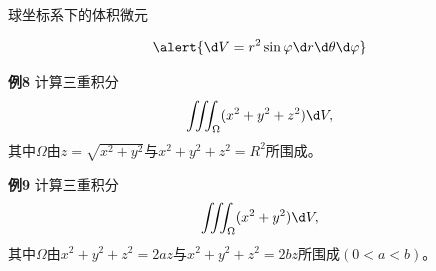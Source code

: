 \begin{frame}{球坐标系下的体积微元}
	\linespread{1.2}\pause 
			\begin{center}
				\pause 
			\end{center}
			{\Large
			\vspace{-1em}
			$$\alert{\d V=r^2\sin\varphi \d r\d\theta \d\varphi}$$
			}
\end{frame}

\begin{frame}
	\linespread{1.2}
	\begin{exampleblock}{{\bf 例8}\hfill}
		计算三重积分
		$$\iiint_{\Omega}(x^2+y^2+z^2)\d V,$$
		其中$\Omega$由$z=\sqrt{x^2+y^2}$与$x^2+y^2+z^2=R^2$所围成。
	\end{exampleblock}
\end{frame}

\begin{frame}
	\linespread{1.2}
	\begin{exampleblock}{{\bf 例9}\hfill}
		计算三重积分
		$$\iiint_{\Omega}(x^2+y^2)\d V,$$
		其中$\Omega$由$x^2+y^2+z^2=2az$与$x^2+y^2+z^2=2bz$所围成$(0<a<b)$。
	\end{exampleblock}
\end{frame}

